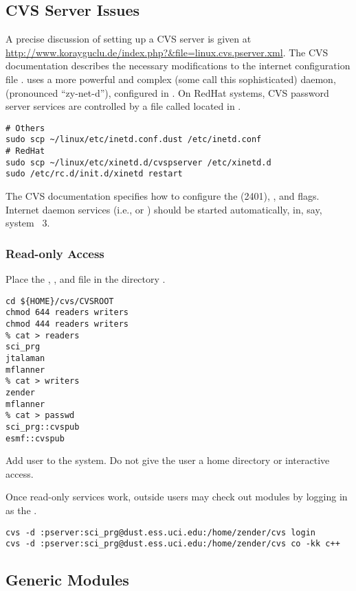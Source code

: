 \documentclass[12pt,twoside]{article}
\begin{document}
\subsection{CVS Server Issues}\label{sxn:cvs_srv}
A precise discussion of setting up a CVS server is given at
\url{http://www.korayguclu.de/index.php?&file=linux.cvs.pserver.xml}.
The CVS documentation describes the necessary modifications to the
internet  configuration file .
 uses a more powerful and complex
(some call this sophisticated) daemon,  (pronounced 
``zy-net-d''), configured in .
On RedHat systems, CVS password server services are controlled by a
file called  located in .
\begin{verbatim}
# Others
sudo scp ~/linux/etc/inetd.conf.dust /etc/inetd.conf
# RedHat
sudo scp ~/linux/etc/xinetd.d/cvspserver /etc/xinetd.d
sudo /etc/rc.d/init.d/xinetd restart
\end{verbatim}
The CVS documentation specifies how to configure the  (2401), , and 
  flags.
Internet daemon services (i.e.,  or )
should be started automatically, in, say, system ~3. 

\subsubsection[Read-only Access]{Read-only Access}\label{sxn:cvs_read}
Place the , , and  file
in the directory .
\begin{verbatim}
cd ${HOME}/cvs/CVSROOT
chmod 644 readers writers
chmod 444 readers writers
% cat > readers
sci_prg
jtalaman
mflanner
% cat > writers
zender
mflanner
% cat > passwd
sci_prg::cvspub
esmf::cvspub
\end{verbatim}
Add user  to the system.
Do not give the user a home directory or interactive access.

Once read-only services work, outside users may check out 
modules by logging in as the .
\begin{verbatim}
cvs -d :pserver:sci_prg@dust.ess.uci.edu:/home/zender/cvs login
cvs -d :pserver:sci_prg@dust.ess.uci.edu:/home/zender/cvs co -kk c++
\end{verbatim}

\subsection{Generic Modules}\label{sxn:cvs_gnr}
\end{document}
